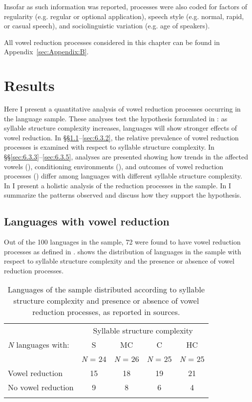   Insofar as such information was reported, processes were also coded for factors of regularity (e.g. regular or optional application), speech style (e.g. normal, rapid, or casual speech), and sociolinguistic variation (e.g. age of speakers).

  All vowel reduction processes considered in this chapter can be found in Appendix~\ref{sec:Appendix:B}.

\section{ Results}\label{sec:6.3}

  Here I present a quantitative analysis of vowel reduction processes occurring in the language sample. These analyses test the hypothesis formulated in : as syllable structure complexity increases, languages will show stronger effects of vowel reduction. In §§\ref{sec:6.3.1}--\ref{sec:6.3.2}, the relative prevalence of vowel reduction processes is examined with respect to syllable structure complexity. In §§\ref{sec:6.3.3}--\ref{sec:6.3.5}, analyses are presented showing how trends in the affected vowels (), conditioning environments (), and outcomes of vowel reduction processes () differ among languages with different syllable structure complexity. In  I present a holistic analysis of the reduction processes in the sample. In  I summarize the patterns observed and discuss how they support the hypothesis.

\subsection{Languages with vowel reduction}\label{sec:6.3.1}

  Out of the 100 languages in the sample, 72 were found to have vowel reduction processes as defined in .  shows the distribution of languages in the sample with respect to syllable structure complexity and the presence or absence of vowel reduction processes.

\begin{table}
\begin{tabular}{lcccc}
\lsptoprule
 & \multicolumn{4}{c}{Syllable structure complexity}\\\cmidrule(lr){2-5}
 \textit{N} languages with: & S & MC & C & HC\\
                            & \textit{N} = 24 & \textit{N} = 26 & \textit{N} = 25 & \textit{N} = 25\\\midrule
 Vowel reduction & 15 & 18 & 19 & 21\\
 No vowel reduction & 9 & 8 & 6 & 4\\
\lspbottomrule
\end{tabular}
\caption{\label{tab:6.1}Languages of the sample distributed according to syllable structure complexity and presence or absence of vowel reduction processes, as reported in sources.}
\end{table}

